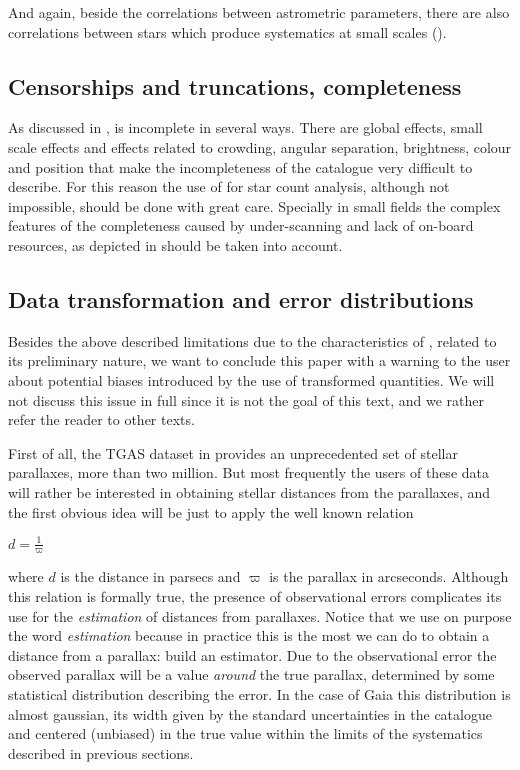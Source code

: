 And again, beside the correlations between astrometric parameters, there are also
correlations between stars which produce systematics at small 
scales ().

\subsection{Censorships and truncations, completeness}

As discussed in , {} is incomplete in several ways. There are global effects, small scale effects and effects related to crowding, angular separation, brightness, colour and position that make the incompleteness of the catalogue very difficult to describe. For this reason the use of {} for star count analysis, although not impossible, should be done with great care. Specially in small fields the complex features of the completeness caused by under-scanning and lack of on-board resources, as depicted in  should be taken into account.

\subsection{Data transformation and error distributions}

Besides the above described limitations due to the characteristics
of {}, related to its preliminary nature, we want to conclude 
this paper with a warning to the user about potential biases
introduced by the use of transformed quantities. We will not discuss
this issue in full since it is not the goal of this text, and 
we rather refer the reader to other texts.

First of all, the TGAS dataset in {} provides an unprecedented
set of stellar parallaxes, more than two million. But most frequently 
the users of these data will rather be interested in obtaining 
stellar distances from the parallaxes, and the first obvious idea
will be just to apply the well known relation 

$d = \frac{1}{\varpi}$

\noindent where $d$ is the distance in parsecs and $\varpi$ is the parallax
in arcseconds. Although this relation is formally true, the presence
of observational errors complicates its use for the {\it estimation}
of distances from parallaxes. Notice that we use on purpose the word {\it
estimation} because in practice this is the most we can do to obtain a distance
from a parallax: build an estimator. Due to the observational error
the observed parallax will be a value {\it around} the true parallax,
determined by some statistical distribution describing the error. In
the case of Gaia this distribution is almost gaussian, its width given
by the standard uncertainties in the catalogue and centered (unbiased) in the
true value within the limits of the systematics described in previous
sections. 

